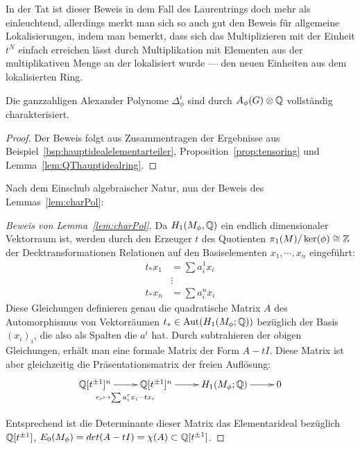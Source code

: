  In der Tat ist dieser Beweis in dem Fall des Laurentrings doch mehr als einleuchtend, allerdings merkt man sich so auch gut den Beweis für allgemeine Lokalisierungen, indem man bemerkt, dass sich das Multiplizieren mit der Einheit $t^N$ einfach erreichen lässt durch Multiplikation mit Elementen aus der multiplikativen Menge an der lokalisiert wurde --- den neuen Einheiten aus dem lokalisierten Ring.

\begin{cor}
	Die ganzzahligen Alexander Polynome $\Delta_\phi^i$ sind durch $A_\phi(G) \otimes \mathbb{Q}$ vollständig charakterisiert.
\end{cor}
\begin{proof}
	Der Beweis folgt aus Zusammentragen der Ergebnisse aus Beispiel~\ref{bsp:hauptidealelementarteiler}, Proposition~\ref{prop:tensoring} und Lemma~\ref{lem:QThauptidealring}.
\end{proof}

 Nach dem Einschub algebraischer Natur, nun der Beweis des Lemmas~\ref{lem:charPol}:
\begin{proof}[Beweis von Lemma~\ref{lem:charPol}]
	Da $H_1(M_\phi,\mathbb{Q})$ ein endlich dimensionaler Vektorraum ist, werden durch den Erzeuger $t$ des Quotienten $\pi_1(M)/\ker(\phi) \cong \mathbb{Z}$ der Decktransformationen Relationen auf den Basiselementen $x_1,\cdots,x_n$ eingeführt:	
	\begin{align*}
		t_*x_1 &= \sum a_i^1 x_i \\
				&\vdots \\
		t_*x_n &= \sum a_i^n x_i
	\end{align*}
	Diese Gleichungen definieren genau die quadratische Matrix $A$ des Automorphismus von Vektorräumen $t_* \in \operatorname{Aut} (H_1(M_\phi;\mathbb{Q}))$ bezüglich der Basis $(x_i)_i$, die also als Spalten die $a^i$ hat. Durch subtrahieren der obigen Gleichungen, erhält man eine formale Matrix der Form $A-tI$. Diese Matrix ist aber gleichzeitig die Präsentationsmatrix der freien Auflösung:
	\[
		\begin{xy}
			\xymatrix@L+5pt{\laurent \QQ t ^n \ar[r]_{e_r\mapsto \sum a_i^rx_i-tx_r} & \laurent \QQ t ^n \ar[r] & H_1(M_\phi;\QQ) \ar[r] &0\\}
		\end{xy}
	\]
	Entsprechend ist die Determinante dieser Matrix das Elementarideal bezüglich $\mathbb{Q}[t^{\pm 1}]$, $E_0(M_\phi)=det(A-tI)=\chi(A) \subset \mathbb{Q}[t^{\pm 1}] $. 
\end{proof}



